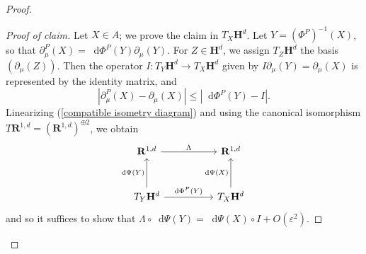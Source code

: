 \documentclass[reqno,10pt]{amsart}
\newcommand{\RR}{\mathbf{R}}
\newcommand{\Hyp}{\mathbf H}
\newcommand*\dif{\mathop{}\!\mathrm{d}}
\theoremstyle{definition}
\numberwithin{equation}{section}
\begin{document}
\begin{proof}
\begin{proof}[Proof of claim]
Let $X \in A$; we prove the claim in $T_X \Hyp^d$.
Let $Y = (\Phi^P)^{-1}(X)$, so that $\partial^P_\mu(X) = \dif \Phi^P(Y) \partial_\mu(Y)$.
For $Z \in \Hyp^d$, we assign $T_Z \Hyp^d$ the basis $(\partial_\mu(Z))$.
Then the operator $I: T_Y \Hyp^d \to T_X \Hyp^d$ given by $I \partial_\mu(Y) = \partial_\mu(X)$ is represented by the identity matrix, and
$$|\partial^P_\mu(X) - \partial_\mu(X)| \leq |\dif \Phi^P(Y) - I|.$$
Linearizing (\ref{compatible isometry diagram}) and using the canonical isomorphism $T\RR^{1, d} = (\RR^{1, d})^{\oplus 2}$, we obtain
$$\begin{tikzcd}[column sep=50pt, row sep=30pt]
\RR^{1, d} \arrow[r, "\Lambda"] & \RR^{1, d} \\
T_Y \Hyp^d \arrow[u, "\dif \Psi(Y)"] \arrow[r, "\dif \Phi^P(Y)"] & T_X \Hyp^d \arrow[u, "\dif \Psi(X)"]
\end{tikzcd}$$
and so it suffices to show that $\Lambda \circ \dif \Psi(Y) = \dif \Psi(X) \circ I + O(\varepsilon^2)$.


\end{proof}
\end{proof}
\end{document}
